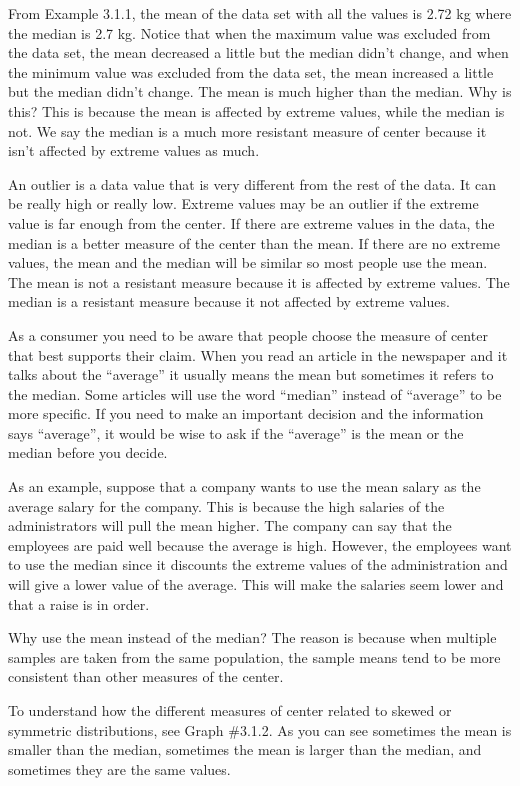 \documentclass[
]{book}
\begin{document}
From Example 3.1.1, the mean of the data set with all the values is 2.72 kg where the median is 2.7 kg. Notice that when the maximum value was excluded from the data set, the mean decreased a little but the median didn't change, and when the minimum value was excluded from the data set, the mean increased a little but the median didn't change. The mean is much higher than the median. Why is this? This is because the mean is affected by extreme values, while the median is not. We say the median is a much more resistant measure of center because it isn't affected by extreme values as much.

An outlier is a data value that is very different from the rest of the data. It can be really high or really low. Extreme values may be an outlier if the extreme value is far enough from the center. If there are extreme values in the data, the median is a better measure of the center than the mean. If there are no extreme values, the mean and the median will be similar so most people use the mean. The mean is not a resistant measure because it is affected by extreme values. The median is a resistant measure because it not affected by extreme values.

As a consumer you need to be aware that people choose the measure of center that best supports their claim. When you read an article in the newspaper and it talks about the ``average'' it usually means the mean but sometimes it refers to the median. Some articles will use the word ``median'' instead of ``average'' to be more specific. If you need to make an important decision and the information says ``average'', it would be wise to ask if the ``average'' is the mean or the median before you decide.

As an example, suppose that a company wants to use the mean salary as the average salary for the company. This is because the high salaries of the administrators will pull the mean higher. The company can say that the employees are paid well because the average is high. However, the employees want to use the median since it discounts the extreme values of the administration and will give a lower value of the average. This will make the salaries seem lower and that a raise is in order.

Why use the mean instead of the median? The reason is because when multiple samples are taken from the same population, the sample means tend to be more consistent than other measures of the center.

To understand how the different measures of center related to skewed or symmetric distributions, see Graph \#3.1.2. As you can see sometimes the mean is smaller than the median, sometimes the mean is larger than the median, and sometimes they are the same values.
\end{document}
